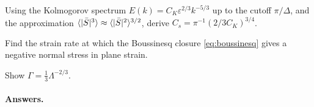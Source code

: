\begin{exercise}\label{ex:smag}
Using the Kolmogorov spectrum $E(k)=C_K\varepsilon^{2/3}k^{-5/3}$ up to the
cutoff $\pi/\Delta$, and the approximation
$\langle |\bar S|^3 \rangle\approx\langle |\bar S|^2 \rangle^{3/2}$, derive
$C_s=\pi^{-1}(2/3C_K)^{3/4}$.
\end{exercise}

\begin{exercise}
Find the strain rate at which the Boussinesq closure \eqref{eq:boussinesq}
gives a negative normal stress in plane strain.
\end{exercise}

\begin{exercise}\label{ex:gamma}
Show $\Gamma=\tfrac13\Lambda^{-2/3}$.
\end{exercise}

\paragraph{Answers.}
